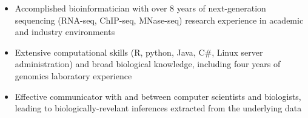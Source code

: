

\begin{resentries}

\vspace{-2mm}

\begin{itemize}[leftmargin=*]
	\setlength{\itemsep}{-1.5mm}
	\item{Accomplished bioinformatician with over 8 years of next-generation sequencing (RNA-seq, ChIP-seq, MNase-seq) research experience in academic and industry environments}
	\item{Extensive computational skills (R, python, Java, C\#, Linux server administration) and broad biological knowledge, including four years of genomics laboratory experience}
	\item{Effective communicator with and between computer scientists and biologists, leading to biologically-revelant inferences extracted from the underlying data}

\end{itemize}

\end{resentries}
